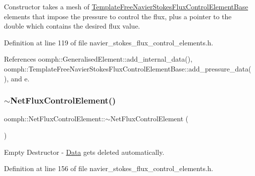 Constructor takes a mesh of \hyperlink{classoomph_1_1TemplateFreeNavierStokesFluxControlElementBase}{Template\+Free\+Navier\+Stokes\+Flux\+Control\+Element\+Base} elements that impose the pressure to control the flux, plus a pointer to the double which contains the desired flux value. 



Definition at line 119 of file navier\+\_\+stokes\+\_\+flux\+\_\+control\+\_\+elements.\+h.



References oomph\+::\+Generalised\+Element\+::add\+\_\+internal\+\_\+data(), oomph\+::\+Template\+Free\+Navier\+Stokes\+Flux\+Control\+Element\+Base\+::add\+\_\+pressure\+\_\+data(), and e.

\mbox{\label{classoomph_1_1NetFluxControlElement_a7a321d25a4fc51822abe7c92c8f37b94}} 
\subsubsection{\texorpdfstring{$\sim$\+Net\+Flux\+Control\+Element()}{~NetFluxControlElement()}}
{\footnotesize\ttfamily oomph\+::\+Net\+Flux\+Control\+Element\+::$\sim$\+Net\+Flux\+Control\+Element (\begin{DoxyParamCaption}{ }\end{DoxyParamCaption})\hspace{0.3cm}{\ttfamily [inline]}}



Empty Destructor -\/ \hyperlink{classoomph_1_1Data}{Data} gets deleted automatically. 



Definition at line 156 of file navier\+\_\+stokes\+\_\+flux\+\_\+control\+\_\+elements.\+h.

\mbox{\label{classoomph_1_1NetFluxControlElement_a3ee9cdd9d404f577db1d18bf4c5e1ae1}} 
